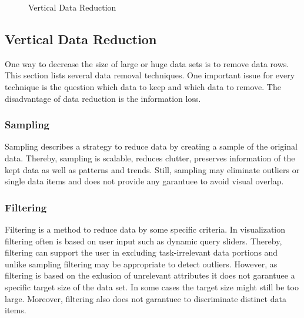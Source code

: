 \begin{figure}[H]
    \centering
    \caption{Vertical Data Reduction}
    \label{fig:my_label}
\end{figure}

\subsection{Vertical Data Reduction}
One way to decrease the size of large or huge data sets is to remove data rows. This section lists several data removal techniques. One important issue for every technique is the question which data to keep and which data to remove. The disadvantage of data reduction is the information loss.
\subsubsection*{Sampling}
Sampling describes a strategy to reduce data by creating a sample of the original data. Thereby, sampling is scalable, reduces clutter, preserves information of the kept data as well as patterns and trends\cite{PiringerHarald2011}. Still, sampling may eliminate outliers or single data items and does not provide any garantuee to avoid visual overlap. 
\subsubsection*{Filtering}
Filtering is a method to reduce data by some specific criteria. In visualization filtering often is based on user input such as dynamic query sliders. Thereby, filtering can support the user in excluding task-irrelevant data portions and unlike sampling filtering may be appropriate to detect outliers. However, as filtering is based on the exlusion of unrelevant attributes it does not garantuee a specific target size of the data set. In some cases the target size might still be too large. Moreover, filtering also does not garantuee to discriminate distinct data items\cite{PiringerHarald2011}.
